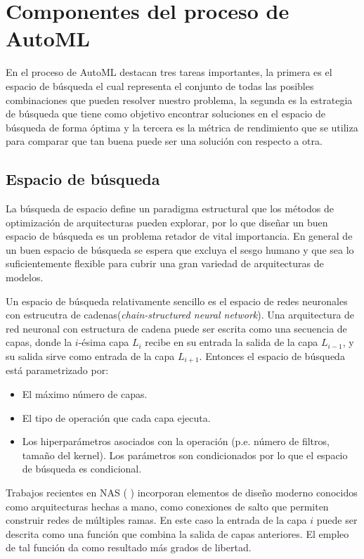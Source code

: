 \section{Componentes del proceso de AutoML}
En el proceso de AutoML destacan tres tareas importantes, la primera es el espacio de búsqueda el cual representa el conjunto de todas las posibles combinaciones que pueden resolver nuestro problema, la segunda es la estrategia de búsqueda que tiene como objetivo encontrar soluciones en el espacio de búsqueda de forma óptima y la tercera es la métrica de rendimiento que se utiliza para comparar que tan buena puede ser una solución con respecto a otra.

\subsection{Espacio de búsqueda}
La búsqueda de espacio define un paradigma estructural que los métodos de optimización de arquitecturas pueden explorar, por lo que diseñar un buen espacio de búsqueda es un problema retador de vital importancia. En general de un buen espacio de búsqueda se espera que excluya el sesgo humano y que sea lo suficientemente flexible para cubrir una gran variedad de arquitecturas de modelos.

Un espacio de búsqueda relativamente sencillo es el espacio de redes neuronales con estrucutra de cadenas(\textit{chain-structured neural network}). Una arquitectura de red neuronal con estructura de cadena puede ser escrita como una secuencia de capas, donde la $i$-ésima capa $L_i$ recibe en su entrada la salida de la capa $L_{i-1}$, y su salida sirve como entrada de la capa $L_{i + 1}$. Entonces el espacio de búsqueda está parametrizado por:

\begin{itemize}
\item El máximo número de capas.
\item El tipo de operación que cada capa ejecuta.
\item Los hiperparámetros asociados con la operación (p.e. número de filtros, tamaño del kernel). Los parámetros son condicionados por lo que el espacio de búsqueda es condicional.
\end{itemize}

Trabajos recientes en NAS (\parencite{56} \parencite{65} \parencite{66} \parencite{67} \parencite{68}) incorporan elementos de diseño moderno conocidos como arquitecturas hechas a mano, como conexiones de salto que permiten construir redes de múltiples ramas. En este caso la entrada de la capa $i$ puede ser descrita como una función que combina la salida de capas anteriores. El empleo de tal función da como resultado más grados de libertad.\\

